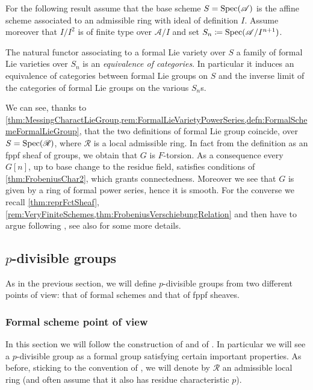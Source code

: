\noindent
For the following result assume that the base scheme \(S = \operatorname{Spec}(\mathscr{A})\)
is the affine scheme associated to an admissible ring with ideal of definition \(I\).
Assume moreover that \(I/I^2\) is of finite type over \(\mathscr{A}/I\) and
set \(S_n \coloneqq \operatorname{Spec}(\mathscr{A}/I^{ n+1 })\).
\begin{lem}
	The natural functor associating to a formal Lie variety over \(S\)
	a family of formal Lie varieties over \(S_n\) is an
	\emph{equivalence of categories}.
	In particular it induces an equivalence of categories
	between formal Lie groups on \(S\) and the inverse limit of the categories
	of formal Lie groups on the various \(S_n\)s.
\end{lem}


\begin{rem}
	We can see, thanks to 
	\cref{thm:MessingCharactLieGroup,rem:FormalLieVarietyPowerSeries,defn:FormalSchemeFormalLieGroup},
	that the two definitions of formal Lie group coincide, over
	$S = \operatorname{Spec}(\mathscr{R})$, where $\mathscr{R}$ is a local admissible ring.
	In fact from the definition as an fppf sheaf of groups,
	we obtain that $G$ is $F$-torsion.
	As a consequence every $G[n]$, up to base
	change to the residue field, satisfies conditions of \cref{thm:FrobeniusChar2},
	which grants connectedness.
	Moreover we see that $G$ is given by a ring of formal power series,
	hence it is smooth.
	For the converse we recall
	\cref{thm:reprFctSheaf},
	\cref{rem:VeryFiniteSchemes,thm:FrobeniusVerschiebungRelation}
	and then have to argue following \cite[proposition 1]{TatePC}, see
	also \cite[Chapter II, \S2, theorem 2.1.7]{Messing} for some more details.
\end{rem}



\subsection{\texorpdfstring{$p$}{p}-divisible groups}
As in the previous section, we will define $p$-divisible groups
from two different points of view: that of formal schemes
and that of fppf sheaves.



\subsubsection{Formal scheme point of view}
In this section we will follow the construction of \cite[\S2]{TatePC} and
of \cite[\S6]{Shatz}. 
In particular we will see a $p$-divisible group as a formal group
satisfying certain important properties.
As before, sticking to the convention of \cite{Shatz}, we will 
denote by $\mathscr{R}$ an admissible local ring (and often assume that
it also has residue characteristic $p$).


